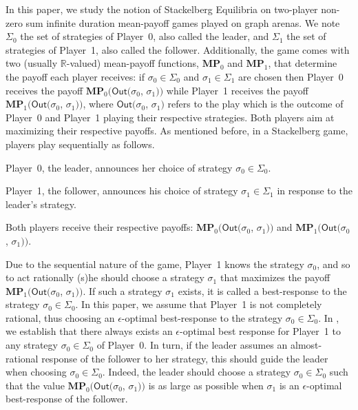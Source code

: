 In this paper, we study the notion of Stackelberg Equilibria on two-player non-zero sum infinite duration mean-payoff games played on graph arenas. We note $\Sigma_0$ the set of strategies of Player~0, also called the leader, and $\Sigma_1$ the set of strategies of Player~1, also called the follower. Additionally,
the game comes with two (usually $\mathbb{R}$-valued) mean-payoff functions, $\mathbf{MP}_0$ and $\mathbf{MP}_1$, that determine the payoff each player receives: if $\sigma_0 \in \Sigma_0$ and $\sigma_1 \in \Sigma_1$ are chosen then Player~0 receives the payoff $\mathbf{MP}_0 (\mathsf{Out}(\sigma_0$, $\sigma_1))$ while Player~1 receives the payoff $\mathbf{MP}_1(\mathsf{Out}(\sigma_0$, $\sigma_1))$, where $\mathsf{Out}(\sigma_0$, $\sigma_1)$ refers to the play which is the outcome of Player~0 and Player~1 playing their respective strategies. Both players aim at maximizing their respective payoffs. As mentioned before, in a Stackelberg game, players play sequentially as follows.
\begin{inparaenum}[(i)]
\item Player~0, the leader, announces her choice of strategy $\sigma_0 \in \Sigma_0$. 
\item Player~1, the follower, announces his choice of strategy $\sigma_1 \in \Sigma_1$ in response to the leader's strategy. 
\item Both players receive their respective payoffs: $\mathbf{MP}_0 (\mathsf{Out}(\sigma_0$, $\sigma_1))$ and $\mathbf{MP}_1 (\mathsf{Out}(\sigma_0$, $\sigma_1))$.
\end{inparaenum}
Due to the sequential nature of the game, Player~1 knows the strategy $\sigma_0$, and so to act rationally (s)he should choose a strategy $\sigma_1$ that maximizes the payoff $\mathbf{MP}_1 (\mathsf{Out}(\sigma_0$, $\sigma_1))$. If such a strategy $\sigma_1$ exists, it is called a best-response to the strategy $\sigma_0 \in \Sigma_0$.
In this paper, we assume that Player~1 is not completely rational, thus choosing an $\epsilon$-optimal best-response to the strategy $\sigma_0 \in \Sigma_0$. In \cite{FGR20}, we establish that there always exists an $\epsilon$-optimal best response for Player~1 to any strategy $\sigma_0 \in \Sigma_0$ of Player~0.
In turn, if the leader assumes an almost-rational response of the follower to her strategy, this should guide the leader when choosing $\sigma_0 \in \Sigma_0$.
Indeed, the leader should choose a strategy $\sigma_0 \in \Sigma_0$ such that the value $\mathbf{MP}_0 (\mathsf{Out}(\sigma_0$, $\sigma_1))$ is as large as possible when $\sigma_1$ is an $\epsilon$-optimal best-response of the follower.


